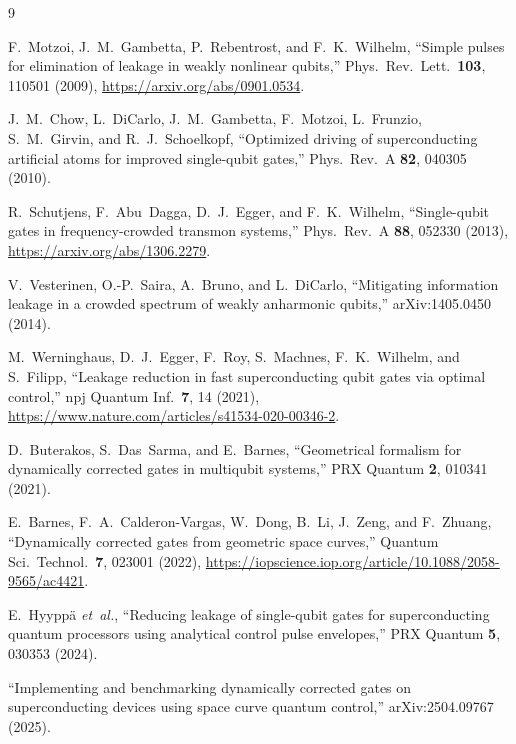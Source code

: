 \documentclass[11pt,a4paper]{article}
\theoremstyle{definition}
\begin{document}
\begin{thebibliography}{9}

F.~Motzoi, J.~M.~Gambetta, P.~Rebentrost, and F.~K.~Wilhelm,
``Simple pulses for elimination of leakage in weakly nonlinear qubits,''
Phys.\ Rev.\ Lett.\ \textbf{103}, 110501 (2009),
\url{https://arxiv.org/abs/0901.0534}.

J.~M.~Chow, L.~DiCarlo, J.~M.~Gambetta, F.~Motzoi, L.~Frunzio, S.~M.~Girvin,
and R.~J.~Schoelkopf,
``Optimized driving of superconducting artificial atoms for improved
single-qubit gates,''
Phys.\ Rev.\ A \textbf{82}, 040305 (2010).

R.~Schutjens, F.~Abu~Dagga, D.~J.~Egger, and F.~K.~Wilhelm,
``Single-qubit gates in frequency-crowded transmon systems,''
Phys.\ Rev.\ A \textbf{88}, 052330 (2013),
\url{https://arxiv.org/abs/1306.2279}.

V.~Vesterinen, O.-P.~Saira, A.~Bruno, and L.~DiCarlo,
``Mitigating information leakage in a crowded spectrum of weakly anharmonic
qubits,''
arXiv:1405.0450 (2014).

M.~Werninghaus, D.~J.~Egger, F.~Roy, S.~Machnes, F.~K.~Wilhelm, and S.~Filipp,
``Leakage reduction in fast superconducting qubit gates via optimal control,''
npj Quantum Inf.\ \textbf{7}, 14 (2021),
\url{https://www.nature.com/articles/s41534-020-00346-2}.

D.~Buterakos, S.~Das~Sarma, and E.~Barnes,
``Geometrical formalism for dynamically corrected gates in multiqubit
systems,''
PRX Quantum \textbf{2}, 010341 (2021).

E.~Barnes, F.~A.~Calderon-Vargas, W.~Dong, B.~Li, J.~Zeng, and F.~Zhuang,
``Dynamically corrected gates from geometric space curves,''
Quantum Sci.\ Technol.\ \textbf{7}, 023001 (2022),
\url{https://iopscience.iop.org/article/10.1088/2058-9565/ac4421}.

E.~Hyypp\"a \emph{et~al.},
``Reducing leakage of single-qubit gates for superconducting quantum processors
using analytical control pulse envelopes,''
PRX Quantum \textbf{5}, 030353 (2024).

``Implementing and benchmarking dynamically corrected gates on superconducting
devices using space curve quantum control,''
arXiv:2504.09767 (2025).

\end{thebibliography}
\end{document}
